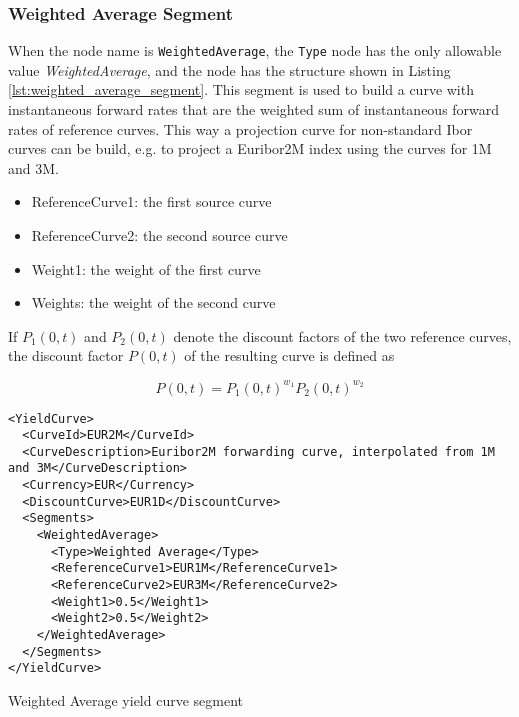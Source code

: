 \subsubsection*{Weighted Average Segment}
\label{sec:yield_plus_default}

When the node name is \lstinline!WeightedAverage!, the \lstinline!Type! node has the only allowable value
\emph{WeightedAverage}, and the node has the structure shown in Listing \ref{lst:weighted_average_segment}. This segment
is used to build a curve with instantaneous forward rates that are the weighted sum of instantaneous forward rates of
reference curves. This way a projection curve for non-standard Ibor curves can be build, e.g. to project a Euribor2M
index using the curves for 1M and 3M.

\begin{itemize}
\item ReferenceCurve1: the first source curve
\item ReferenceCurve2: the second source curve
\item Weight1: the weight of the first curve
\item Weights: the weight of the second curve
\end{itemize}

If $P_1(0,t)$ and $P_2(0,t)$ denote the discount factors of the two reference curves, the discount factor $P(0,t)$ of
the resulting curve is defined as

\begin{equation}
P(0,t) = P_1(0,t)^{w_1}P_2(0,t)^{w_2}
\end{equation}

\begin{listing}[H]
\begin{verbatim}
<YieldCurve>
  <CurveId>EUR2M</CurveId>
  <CurveDescription>Euribor2M forwarding curve, interpolated from 1M and 3M</CurveDescription>
  <Currency>EUR</Currency>
  <DiscountCurve>EUR1D</DiscountCurve>
  <Segments>
    <WeightedAverage>
      <Type>Weighted Average</Type>
      <ReferenceCurve1>EUR1M</ReferenceCurve1>
      <ReferenceCurve2>EUR3M</ReferenceCurve2>
      <Weight1>0.5</Weight1>
      <Weight2>0.5</Weight2>
    </WeightedAverage>
  </Segments>
</YieldCurve>
\end{verbatim}
\caption{Weighted Average yield curve segment}
\label{lst:weighted_average_segment}
\end{listing}
